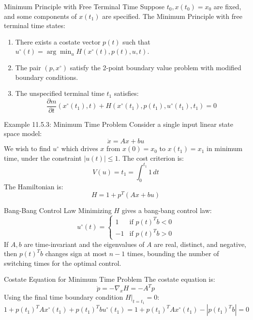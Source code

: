 \documentclass[10pt]{beamer}
\begin{document}
\begin{frame}[fragile]{Minimum Principle with Free Terminal Time}
  Suppose \( t_0, x(t_0) = x_0 \) are fixed, and some components of \( x(t_1) \) are specified. The Minimum Principle with free terminal time states:
  \begin{enumerate}
      \item There exists a costate vector \( p(t) \) such that \( u^\circ(t) = \arg \min_u H(x^\circ(t), p(t), u, t) \).
      \item The pair \( (p, x^\circ) \) satisfy the 2-point boundary value problem with modified boundary conditions.
      \item The unspecified terminal time \( t_1 \) satisfies:
      \[
      \frac{\partial m}{\partial t}(x^\circ(t_1), t) + H(x^\circ(t_1), p(t_1), u^\circ(t_1), t_1) = 0
      \]
  \end{enumerate}
\end{frame}
  
\begin{frame}[fragile]{Example 11.5.3: Minimum Time Problem}
  Consider a single input linear state space model:
  \[
  \dot{x} = Ax + bu
  \]
  We wish to find \( u^\circ \) which drives \( x \) from \( x(0) = x_0 \) to \( x(t_1) = x_1 \) in minimum time, under the constraint \( |u(t)| \le 1 \). The cost criterion is:
  \[
  V(u) = t_1 = \int_0^{t_1} 1 \, dt
  \]
  The Hamiltonian is:
  \[
  H = 1 + p^T(Ax + bu)
  \]
\end{frame}
  
\begin{frame}[fragile]{Bang-Bang Control Law}
  Minimizing \( H \) gives a bang-bang control law:
  \[
  u^\circ(t) = \begin{cases}
  1 & \text{if } p(t)^T b < 0 \\
  -1 & \text{if } p(t)^T b > 0
  \end{cases}
  \]
  If \( A, b \) are time-invariant and the eigenvalues of \( A \) are real, distinct, and negative, then \( p(t)^T b \) changes sign at most \( n - 1 \) times, bounding the number of switching times for the optimal control.
\end{frame}
  
\begin{frame}[fragile]{Costate Equation for Minimum Time Problem}
  The costate equation is:
  \[
  \dot{p} = -\nabla_x H = -A^T p
  \]
  Using the final time boundary condition \( H|_{t=t_1} = 0 \):
  \[
  1 + p(t_1)^T A x^\circ(t_1) + p(t_1)^T b u^\circ(t_1) = 1 + p(t_1)^T A x^\circ(t_1) - |p(t_1)^T b| = 0
  \]
\end{frame}
  
\end{document}
